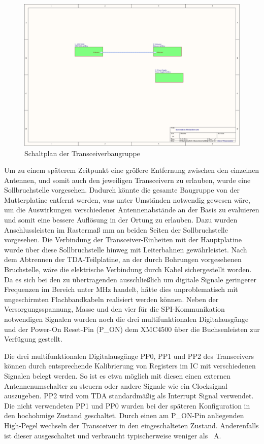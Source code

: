 \begin{figure}[h]
\centering
\includegraphics[width=\linewidth,page=4]{"../../Altium/mobile Basisstation/Project Outputs for mobile Basisstation/Basisstation Schematics"}
\caption{Schaltplan der Transceiverbaugruppe}
\label{fig:schemTDA}
\end{figure}

Um zu einem späterem Zeitpunkt eine größere Entfernung zwischen den einzelnen Antennen, und somit auch den jeweiligen Transceivern zu erlauben, wurde eine Sollbruchstelle vorgesehen. Dadurch könnte die gesamte Baugruppe von der Mutterplatine entfernt werden, was unter Umständen notwendig gewesen wäre, um die Auswirkungen verschiedener Antennenabstände an der Basis zu evaluieren und somit eine bessere Auflösung in der Ortung zu erlauben. Dazu wurden Anschlussleisten im Rastermaß \unit[2,54]{mm} an beiden Seiten der Sollbruchstelle vorgesehen. Die Verbindung der Transceiver-Einheiten mit der Hauptplatine wurde über diese Sollbruchstelle hinweg mit Leiterbahnen gewährleistet. Nach dem Abtrennen der TDA-Teilplatine, an der durch Bohrungen vorgesehenen Bruchstelle, wäre die elektrische Verbindung durch Kabel sichergestellt worden. Da es sich bei den zu übertragenden ausschließlich um digitale Signale  geringerer Frequenzen im Bereich unter \unit[1]{MHz} handelt, hätte dies unproblematisch mit ungeschirmten Flachbandkabeln realisiert werden können. Neben der Versorgungsspannung, Masse und den vier für die \ac{SPI}-Kommunikation notwendigen Signalen wurden noch die drei multifunktionalen Digitalausgänge und der Power-On Reset-Pin (P\_ON) dem XMC4500 über die Buchsenleisten zur Verfügung gestellt.



Die drei multifunktionalen Digitalausgänge PP0, PP1 und PP2 des Transceivers können durch entsprechende Kalibrierung von Registers im \ac{IC} mit verschiedenen Signalen belegt werden. So  ist es etwa möglich mit diesen einen externen Antennenumschalter zu steuern oder andere Signale wie ein Clocksignal auszugeben. PP2 wird vom TDA standardmäßig als Interrupt Signal verwendet. Die nicht verwendeten PP1 und PP0 wurden bei der späteren Konfiguration in den hochohmige Zustand geschaltet. Durch einen am  P\_ON-Pin anliegenden High-Pegel wechseln der Transceiver in den eingeschalteten Zustand. Anderenfalls ist dieser ausgeschaltet und verbraucht typischerweise weniger als \unit[1]{\textmu A}.


